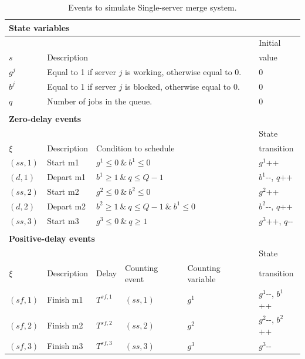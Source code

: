 \documentclass[suppldata]{interact}
\theoremstyle{plain}
\theoremstyle{definition}
\theoremstyle{remark}
\begin{document}
\begin{table}[H]
	\begin{tabular}{llllll} 
		\multicolumn{6}{l}{\textbf{State variables}}\\ \hline
		&&&&& Initial\\
		$s$ & \multicolumn{4}{l}{Description}& value\\\hline
		$g^{j}$&\multicolumn{4}{l}{Equal to 1 if server $j$ is working, otherwise equal to 0.}&0\\
		$b^{j}$&\multicolumn{4}{l}{Equal to 1 if server $j$ is blocked, otherwise equal to 0.}&0\\
		$q$&\multicolumn{4}{l}{Number of jobs in the queue.}&0\\
		&&&&&\\
		\multicolumn{6}{l}{\textbf{Zero-delay events}}\\ \hline
		&&&&& State\\
		$\xi$&Description &  \multicolumn{3}{l}{Condition to schedule}& transition\\\hline
		$({ss,1})$ & Start m1 &  \multicolumn{3}{l}{$g^1\le 0\ \&\ b^1\le0 $} & $g^1${\footnotesize++} \\
		$({d,1})$&Depart m1&  \multicolumn{3}{l}{$b^1\ge1\ \&\  q\le Q-1$} &$b^1${\small-}{\small-}, $q${\footnotesize++} \\
		$({ss,2})$& Start m2 &  \multicolumn{3}{l}{$g^2\le 0\ \&\ b^2\le0 $} & $g^2${\footnotesize++} \\
		$({d,2})$&Depart m2&\multicolumn{3}{l}{$b^2\ge1\ \&\ q\le Q-1\ \&\ b^1\le 0$}&  $b^2${\small-}{\small-}, $q${\footnotesize++} \\
		$({ss,3})$ & Start m3 & \multicolumn{3}{l}{$g^3 \le 0\ \&\ q\ge 1$}&$g^3${\footnotesize++}, $q${\small-}{\small-} \\
		&&&&&\\
		\multicolumn{6}{l}{\textbf{Positive-delay events}}\\ \hline
		&&& &  & State \\
		$\xi$&Description & Delay &  Counting event& Counting variable & transition\\\hline
		$({sf,1})$&Finish m1 & $T^{sf,1}$& ${(ss,1)}$&  $g^1$&  $g^1${\small-}{\small-}, $b^1${\footnotesize++}\\	
		$({sf,2})$&Finish m2 & $T^{sf,2}$& ${(ss,2)}$&  $g^2$&  $g^2${\small-}{\small-}, $b^2${\footnotesize++}\\	
		$({sf,3})$&Finish m3 & $T^{sf,3}$& ${(ss,3)}$&  $g^3$&  $g^3${\small-}{\small-}\\	\hline
	\end{tabular}
	\caption{Events to simulate Single-server merge system.}
	\label{tab:merge}
\end{table}
\end{document}
